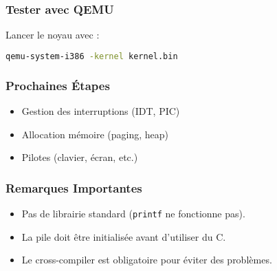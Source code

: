 \documentclass{article}
\begin{document}
\subsubsection*{Tester avec QEMU}
Lancer le noyau avec :
\begin{lstlisting}[language=bash]
qemu-system-i386 -kernel kernel.bin
\end{lstlisting}

\subsubsection*{Prochaines Étapes}
\begin{itemize}
    \item Gestion des interruptions (IDT, PIC)
    \item Allocation mémoire (paging, heap)
    \item Pilotes (clavier, écran, etc.)
\end{itemize}

\subsubsection*{Remarques Importantes}
\begin{itemize}
    \item Pas de librairie standard (\texttt{printf} ne fonctionne pas).
    \item La pile doit être initialisée avant d'utiliser du C.
    \item Le cross-compiler est obligatoire pour éviter des problèmes.
\end{itemize}
\newpage
\end{document}
